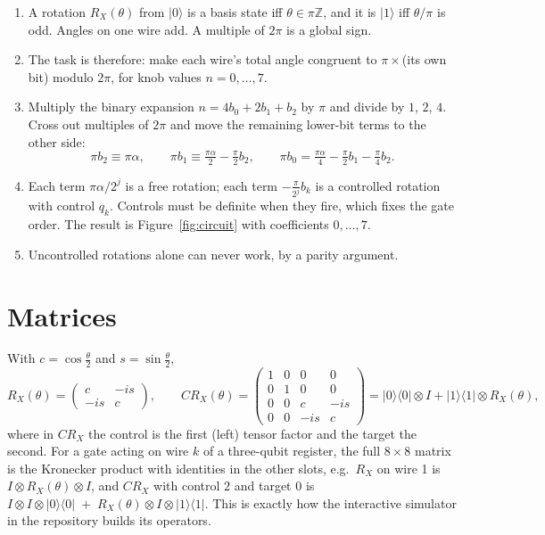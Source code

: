 \documentclass[11pt,a4paper]{article}
\newcommand{\ket}[1]{\lvert #1 \rangle}
\newcommand{\bra}[1]{\langle #1 \rvert}
\newcommand{\RX}{R_X}
\newcommand{\CRX}{CR_X}
\newcommand{\Z}{\mathbb{Z}}
\theoremstyle{plain}
\theoremstyle{definition}
\theoremstyle{remark}
\begin{document}
\begin{enumerate}[nosep]
\item A rotation $\RX(\theta)$ from $\ket{0}$ is a basis state iff $\theta\in\pi\Z$, and it is
      $\ket{1}$ iff $\theta/\pi$ is odd. Angles on one wire add. A multiple of $2\pi$ is a global
      sign.
\item The task is therefore: make each wire's total angle congruent to $\pi\times$(its own bit)
      modulo $2\pi$, for knob values $n = 0,\dots,7$.
\item Multiply the binary expansion $n = 4b_0+2b_1+b_2$ by $\pi$ and divide by $1$, $2$, $4$.
      Cross out multiples of $2\pi$ and move the remaining lower-bit terms to the other side:
      \[
      \pi b_2 \equiv \pi\alpha,\qquad
      \pi b_1 \equiv \tfrac{\pi\alpha}{2} - \tfrac{\pi}{2}b_2,\qquad
      \pi b_0 = \tfrac{\pi\alpha}{4} - \tfrac{\pi}{2}b_1 - \tfrac{\pi}{4}b_2 .
      \]
\item Each term $\pi\alpha/2^{j}$ is a free rotation; each term $-\frac{\pi}{2^{j}}b_k$ is a
      controlled rotation with control $q_k$. Controls must be definite when they fire, which
      fixes the gate order. The result is Figure~\ref{fig:circuit} with coefficients $0,\dots,7$.
\item Uncontrolled rotations alone can never work, by a parity argument.
\end{enumerate}

\appendix
\section{Matrices}\label{app:matrices}

With $c = \cos\frac{\theta}{2}$ and $s = \sin\frac{\theta}{2}$,
\[
\RX(\theta) = \begin{pmatrix} c & -is\\ -is & c\end{pmatrix},\qquad
\CRX(\theta) = \begin{pmatrix} 1&0&0&0\\ 0&1&0&0\\ 0&0&c&-is\\ 0&0&-is&c\end{pmatrix}
             = \ket{0}\!\bra{0}\otimes I + \ket{1}\!\bra{1}\otimes \RX(\theta),
\]
where in $\CRX$ the control is the first (left) tensor factor and the target the second. For a
gate acting on wire $k$ of a three-qubit register, the full $8\times8$ matrix is the Kronecker
product with identities in the other slots, e.g.\ $\RX$ on wire 1 is $I\otimes\RX(\theta)\otimes I$,
and $\CRX$ with control $2$ and target $0$ is
$I\otimes I\otimes\ket{0}\!\bra{0} \;+\; \RX(\theta)\otimes I\otimes\ket{1}\!\bra{1}$.
This is exactly how the interactive simulator in the repository builds its operators.
\end{document}
